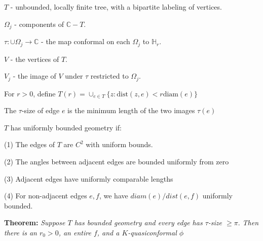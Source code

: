 \documentclass{beamer}
\begin{document}
\begin{frame}

{\tiny $T$ - unbounded, locally finite tree, with a bipartite labeling of vertices.

$\Omega_j$ - components of $\mathbb{C}-T$.

$\tau: \cup \Omega_j \rightarrow \mathbb{C}$ - the map conformal on each $\Omega_j$ to $\mathbb{H}_r$.

$V$ - the vertices of $T$. 

$V_j$ - the image of $V$ under $\tau$ restricted to $\Omega_j$.

For $r > 0$, define $T(r) = \cup_{e\in T} \{z : \textrm{dist}(z,e) < r\textrm{diam}(e) \}$

The $\tau$-size of edge $e$ is the minimum length of the two images $\tau(e)$

\vspace{2.5mm}

$T$ has uniformly bounded geometry if: 

\hspace{5mm} (1) The edges of $T$ are $C^2$ with uniform bounds. 

\hspace{5mm} (2) The angles between adjacent edges are bounded uniformly from zero

\hspace{5mm} (3) Adjacent edges have uniformly comparable lengths

\hspace{5mm} (4) For non-adjacent edges $e, f$, we have $diam(e)/dist(e,f)$ uniformly bounded. 

 }
\vspace{5mm}
{\bf Theorem:} {\it  Suppose $T$ has bounded geometry and every edge has $\tau$-size $\geq \pi.$  Then there is an $r_0 > 0$, an entire $f$, and a $K$-quasiconformal $\phi$}  

\end{frame}
\end{document}
